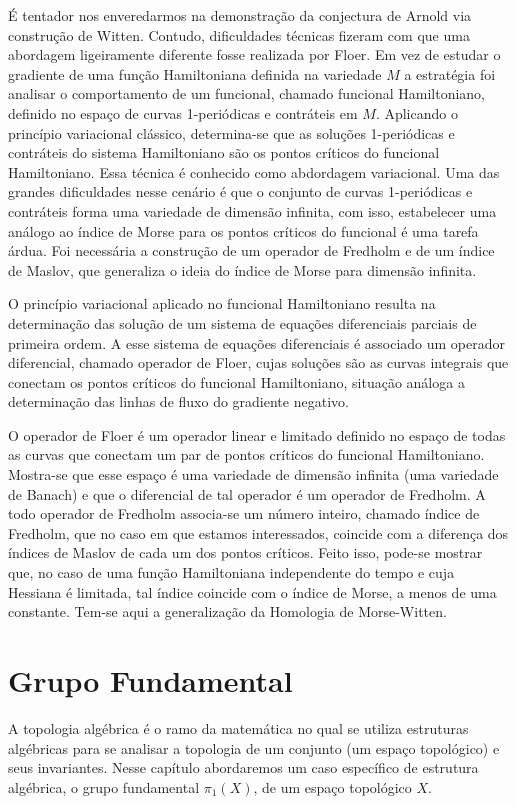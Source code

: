 \documentclass[12pt]{book}
\newcommand{\grupofundamental}[1]{\pi_{1}(#1)}
\begin{document}
	É tentador nos enveredarmos na demonstração da conjectura de Arnold via construção de Witten. Contudo, dificuldades técnicas fizeram com que uma abordagem ligeiramente diferente fosse realizada por Floer. Em vez de estudar o gradiente de uma função Hamiltoniana definida na variedade $M$ a estratégia foi analisar o comportamento de um funcional, chamado funcional Hamiltoniano, definido no espaço de curvas 1-periódicas e contráteis em $M$. Aplicando o princípio variacional clássico, determina-se que as soluções 1-periódicas e contráteis do sistema Hamiltoniano são os pontos críticos do funcional Hamiltoniano. Essa técnica é conhecido como abdordagem variacional. Uma das grandes dificuldades nesse cenário é que o conjunto de curvas 1-periódicas e contráteis forma uma variedade de dimensão infinita, com isso, estabelecer uma análogo ao índice de Morse para os pontos críticos do funcional é uma tarefa árdua. Foi necessária a construção de um operador de Fredholm e de um índice de Maslov, que generaliza o ideia do índice de Morse para dimensão infinita.
	
	O princípio variacional aplicado no funcional Hamiltoniano resulta na determinação das solução de um sistema de equações diferenciais parciais de primeira ordem. A esse sistema de equações diferenciais é associado um operador diferencial, chamado operador de Floer, cujas soluções são as curvas integrais que conectam os pontos críticos do funcional Hamiltoniano, situação análoga a determinação das linhas de fluxo do gradiente negativo.
	
	O operador de Floer é um operador linear e limitado definido no espaço de todas as curvas que conectam um par de pontos críticos do funcional Hamiltoniano. Mostra-se que esse espaço é uma variedade de dimensão infinita (uma variedade de Banach) e que o diferencial de tal operador é um operador de Fredholm. A todo operador de Fredholm associa-se um número inteiro, chamado índice de Fredholm, que no caso em que estamos interessados, coincide com a diferença dos índices de Maslov de cada um dos pontos críticos. Feito isso, pode-se mostrar que, no caso de uma função Hamiltoniana independente do tempo e cuja Hessiana é limitada, tal índice coincide com o índice de Morse, a menos de uma constante. Tem-se aqui a generalização da Homologia de Morse-Witten.
	
	\chapter{Grupo Fundamental}\label{capitulo_grupo_fundamental}
	A topologia algébrica é o ramo da matemática no qual se utiliza estruturas algébricas para se analisar a topologia de um conjunto (um espaço topológico) e seus invariantes. Nesse capítulo abordaremos um caso específico de estrutura algébrica, o grupo fundamental $\grupofundamental{X}$, de um espaço topológico $X$.
	
\end{document}
